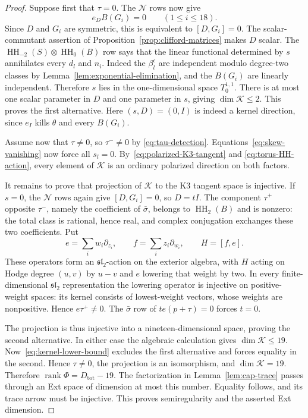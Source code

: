 \documentclass[11pt]{article}
\numberwithin{equation}{section}
\theoremstyle{definition}
\theoremstyle{remark}
\newcommand{\HH}{\operatorname{HH}}
\begin{document}
\begin{proof}
Suppose first that $\tau=0$. The $\mathcal N$ rows now give
\[
 e_DB(G_i)=0\qquad(1\le i\le18).
\]
Since $D$ and $G_i$ are symmetric, this is equivalent to
$[D,G_i]=0$. The scalar-commutant assertion of
Proposition~\ref{prop:clifford-matrices} makes $D$ scalar.
The $\HH_{-2}(S)\otimes\HH_0(B)$ row says that the linear
functional determined by $s$ annihilates every $d_l$ and $n_i$.
Indeed the $\beta_l^\epsilon$ are independent modulo degree-two
classes by Lemma~\ref{lem:exponential-elimination}, and the
$B(G_i)$ are linearly independent. Therefore $s$ lies in the
one-dimensional space $T_0^{1,1}$. There is at most one scalar
parameter in $D$ and one parameter in $s$, giving $\dim \mathcal K\le2$.
This proves the first alternative. Here $(s,D)=(0,I)$ is indeed
a kernel direction, since $e_I$ kills $\theta$ and every $B(G_i)$.

Assume now that $\tau\ne0$, so $\tau^-\ne0$ by
\eqref{eq:tau-detection}. Equations~\eqref{eq:skew-vanishing}
now force all $s_l=0$. By~\eqref{eq:polarized-K3-tangent} and
\eqref{eq:torus-HH-action}, every element of $\mathcal K$ is an ordinary
polarized direction on both factors.

It remains to prove that projection of $\mathcal K$ to the K3 tangent space
is injective. If $s=0$, the $\mathcal N$ rows again give
$[D,G_i]=0$, so $D=tI$. The component $\tau^+$ opposite $\tau^-$,
namely the coefficient of $\bar\sigma$, belongs to $\HH_2(B)$
and is nonzero: the total class is rational, hence real, and
complex conjugation exchanges these two coefficients. Put
\[
 e=\sum_iw_i\partial_{z_i},\qquad
 f=\sum_iz_i\partial_{w_i},\qquad H=[f,e].
\]
These operators form an $\mathfrak{sl}_2$-action on the exterior
algebra, with $H$ acting on Hodge degree $(u,v)$ by $u-v$ and $e$
lowering that weight by two. In every finite-dimensional
$\mathfrak{sl}_2$ representation the lowering operator is injective
on positive-weight spaces: its kernel consists of lowest-weight
vectors, whose weights are nonpositive. Hence $e\tau^+\ne0$.
The $\bar\sigma$ row of $t e(p+\tau)=0$ forces $t=0$.

The projection is thus injective into a nineteen-dimensional
space, proving the second alternative. In either case the
algebraic calculation gives $\dim\mathcal K\le19$.
Now~\eqref{eq:kernel-lower-bound} excludes the first alternative
and forces equality in the second. Hence $\tau\ne0$, the
projection is an isomorphism, and $\dim\mathcal K=19$. Therefore
$\operatorname{rank}\Phi=D_{\mathrm{tot}}-19$.
The factorization in Lemma~\ref{lem:cap-trace} passes through an
Ext space of dimension at most this number. Equality follows,
and its trace arrow must be injective. This proves semiregularity
and the asserted Ext dimension.
\end{proof}
\end{document}
